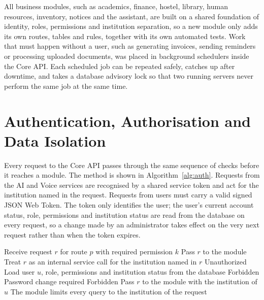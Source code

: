 All business modules, such as academics, finance, hostel, library, human resources, inventory, notices and the assistant, are built on a shared foundation of identity, roles, permissions and institution separation, so a new module only adds its own routes, tables and rules, together with its own automated tests. Work that must happen without a user, such as generating invoices, sending reminders or processing uploaded documents, was placed in background schedulers inside the Core API. Each scheduled job can be repeated safely, catches up after downtime, and takes a database advisory lock so that two running servers never perform the same job at the same time.

\section{Authentication, Authorisation and Data Isolation}
Every request to the Core API passes through the same sequence of checks before it reaches a module. The method is shown in Algorithm~\ref{alg:auth}. Requests from the AI and Voice services are recognised by a shared service token and act for the institution named in the request. Requests from users must carry a valid signed JSON Web Token. The token only identifies the user; the user's current account status, role, permissions and institution status are read from the database on every request, so a change made by an administrator takes effect on the very next request rather than when the token expires.

\begin{algorithm}
    \caption{Authenticating and authorising a Core API request}
    \label{alg:auth}
    \begin{algorithmic}[1]
    \State Receive request $r$ for route $p$ with required permission $k$
        \State Pass $r$ to the module
        \State Treat $r$ as an internal service call for the institution named in $r$
        \State {} Unauthorized
    \Else
        \State Load user $u$, role, permissions and institution status from the database
            \State {} Forbidden
        \EndIf
            \State {} Password change required
        \EndIf
            \State {} Forbidden
        \EndIf
        \State Pass $r$ to the module with the institution of $u$
    \EndIf
    \State The module limits every query to the institution of the request
    \end{algorithmic}
\end{algorithm}

